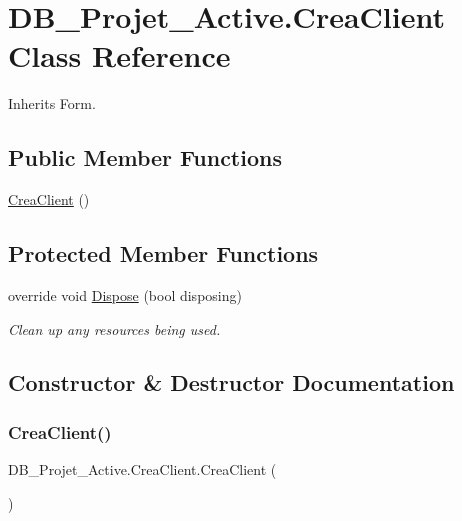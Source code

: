 \hypertarget{class_d_b___projet___active_1_1_crea_client}{}\section{D\+B\+\_\+\+Projet\+\_\+\+Active.\+Crea\+Client Class Reference}
\label{class_d_b___projet___active_1_1_crea_client}


Inherits Form.

\subsection*{Public Member Functions}
\begin{DoxyCompactItemize}
\item 
\mbox{\hyperlink{class_d_b___projet___active_1_1_crea_client_a4ee5d0da88963756ca0d3e7c90e05735}{Crea\+Client}} ()
\end{DoxyCompactItemize}
\subsection*{Protected Member Functions}
\begin{DoxyCompactItemize}
\item 
override void \mbox{\hyperlink{class_d_b___projet___active_1_1_crea_client_a90a6217db2aa0fcb6f38649585ec9193}{Dispose}} (bool disposing)
\begin{DoxyCompactList}\small\item\em Clean up any resources being used. \end{DoxyCompactList}\end{DoxyCompactItemize}


\subsection{Constructor \& Destructor Documentation}
\mbox{\label{class_d_b___projet___active_1_1_crea_client_a4ee5d0da88963756ca0d3e7c90e05735}} 
\subsubsection{\texorpdfstring{CreaClient()}{CreaClient()}}
{\footnotesize\ttfamily D\+B\+\_\+\+Projet\+\_\+\+Active.\+Crea\+Client.\+Crea\+Client (\begin{DoxyParamCaption}{ }\end{DoxyParamCaption})}



